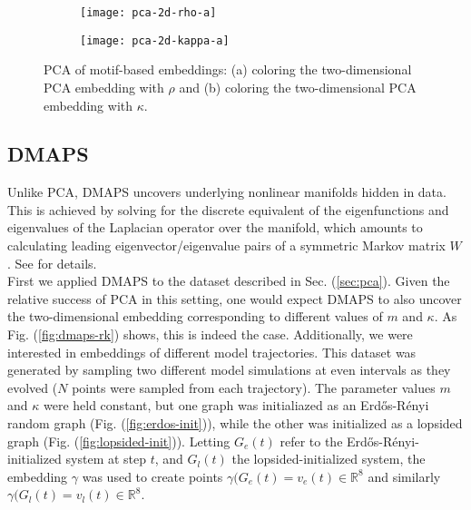 \documentclass[epjST, final]{svjour}
\begin{document}
\begin{onehalfspace}
\begin{figure}[h!]
  \vspace{-5mm}
  \centering
  \begin{subfigure}{0.49\textwidth}
    \centering
    \texttt{[image: pca-2d-rho-a]}
    \subcaption{\label{fig:pca-rho}}
  \end{subfigure} %
  \begin{subfigure}{0.49\textwidth}
    \centering
    \texttt{[image: pca-2d-kappa-a]}
    \subcaption{\label{fig:pca-kappa}}
  \end{subfigure}%
  \caption{PCA of motif-based embeddings: (a) coloring the
    two-dimensional PCA embedding with $\rho$ and (b) coloring the
    two-dimensional PCA embedding with $\kappa$. \label{fig:pca}}
\end{figure}

\subsection{DMAPS}

Unlike PCA, DMAPS uncovers underlying nonlinear manifolds hidden in data. This is achieved by solving for the discrete equivalent of the eigenfunctions and eigenvalues of the Laplacian operator over the manifold, which amounts to calculating leading eigenvector/eigenvalue pairs of a symmetric Markov matrix $W$. See \cite{coifman_diffusion_2006,nadler_diffusion_2006} for details. \\

First we applied DMAPS to the dataset described in
Sec. (\ref{sec:pca}). Given the relative success of PCA in this
setting, one would expect DMAPS to also uncover the two-dimensional
embedding corresponding to different values of $m$ and $\kappa$. As
Fig. (\ref{fig:dmaps-rk}) shows, this is indeed the
case. Additionally, we were interested in embeddings of different
model trajectories. This dataset was generated by sampling two
different model simulations at even intervals as they evolved ($N$
points were sampled from each trajectory). The parameter values $m$
and $\kappa$ were held constant, but one graph was initialiazed as an
Erd\H{o}s-R\'{e}nyi random graph (Fig. (\ref{fig:erdos-init})), while
the other was initialized as a lopsided graph
(Fig. (\ref{fig:lopsided-init})). Letting $G_e(t)$ refer to the
Erd\H{o}s-R\'{e}nyi-initialized system at step $t$, and $G_l(t)$ the
lopsided-initialized system, the embedding $\gamma$ was used to create
points $\gamma(G_e(t) = v_e(t) \in \mathbb{R}^8$ and similarly
$\gamma(G_l(t) = v_l(t) \in \mathbb{R}^8$. \\ 


\end{onehalfspace}
\end{document}
